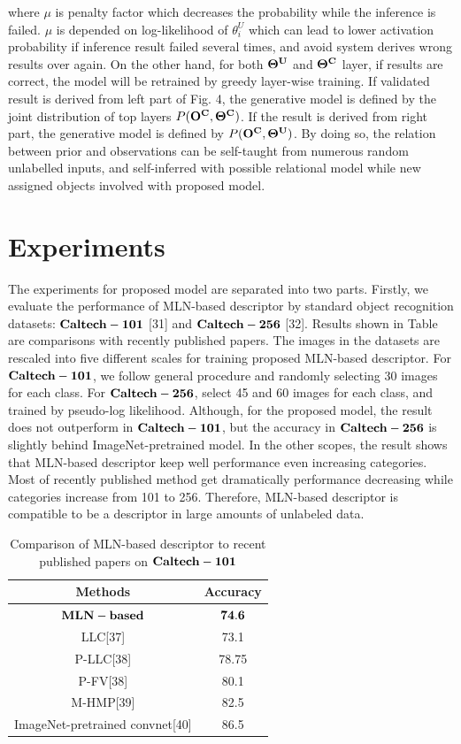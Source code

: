 \documentclass[journal]{IEEEtran}
\begin{document}
where $\mu$ is penalty factor which decreases the probability while the inference is failed. $\mu$ is depended on log-likelihood of $\theta^U_i$ which can lead to lower activation probability if inference result failed several times, and avoid system derives wrong results over again. 
On the other hand, for both $\bf{\Theta^U}$ and $\bf{\Theta^C}$ layer, if results are correct, the model will be retrained by greedy layer-wise training. If validated result is derived from left part of Fig. 4, the generative model is defined by the joint distribution of top layers $P(\bf{O^C} , \bf{\Theta^C})$. If the result is derived from right part, the generative model is defined by  $P(\bf{O^C} , \bf{\Theta^U})$. By doing so, the relation between prior and observations can be self-taught from numerous random unlabelled inputs, and self-inferred with possible relational model while new assigned objects involved with proposed model.



\section{Experiments}
The experiments for proposed model are separated into two parts. Firstly, we evaluate the performance of MLN-based descriptor by standard object recognition datasets: $\bf{Caltech-101}$ [31] and $\bf{Caltech-256}$ [32]. Results shown in Table \uppercase\expandafter{} are comparisons with recently published papers. The images in the datasets are rescaled into five different scales for training proposed MLN-based descriptor. For $\bf{Caltech-101}$, we follow general procedure and randomly selecting 30 images for each class. For $\bf{Caltech-256}$, select 45 and 60 images for each class, and trained by pseudo-log likelihood. Although, for the proposed model, the result does not outperform in $\bf{Caltech-101}$, but the accuracy in $\bf{Caltech-256}$ is slightly behind ImageNet-pretrained model. In the other scopes, the result shows that MLN-based descriptor keep well performance even increasing categories. Most of recently published method get dramatically performance decreasing while categories increase from 101 to 256. Therefore, MLN-based descriptor is compatible to be a descriptor in large amounts of unlabeled data.


\begin{table}[!t]
\caption{Comparison of MLN-based descriptor to recent published papers on $\bf{Caltech-101}$}
\begin{center}
\begin{tabular}{|c|c|}
\hline
Methods & Accuracy \\
\hline
$\bf{MLN-based}$ & $\bf{74.6}$ \\
\hline
LLC[37] & 73.1 \\
\hline
P-LLC[38] & 78.75\\
\hline
P-FV[38] & 80.1\\
\hline
M-HMP[39] & 82.5 \\
\hline
ImageNet-pretrained convnet[40] & 86.5 \\
\hline
\end{tabular}
\end{center}
\end{table}
\end{document}
